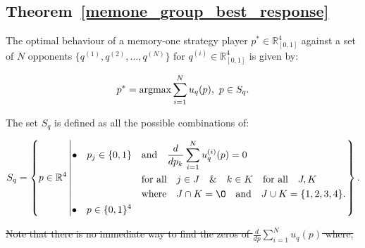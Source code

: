 \documentclass[10pt]{article}
\newcommand{\R}{\mathbb{R}}
\newtheorem{theorem}{Theorem}
\providecommand{\DIFaddtex}[1]{{\protect\color{blue}\uwave{#1}}} %
\providecommand{\DIFdeltex}[1]{{\protect\color{red}\sout{#1}}}                      %
\providecommand{\DIFaddbegin}{} %
\providecommand{\DIFaddend}{} %
\providecommand{\DIFdelbegin}{} %
\providecommand{\DIFdelend}{} %
\providecommand{\DIFadd}[1]{\texorpdfstring{\DIFaddtex{#1}}{#1}} %
\providecommand{\DIFdel}[1]{\texorpdfstring{\DIFdeltex{#1}}{}} %
\newcommand{\DIFscaledelfig}{0.5}
\newlength{\DIFdelgraphicswidth} %
\newlength{\DIFdelgraphicsheight} %
\newcommand{\DIFaddincludegraphics}[2][]{{\color{blue}\fbox{\DIFOincludegraphics[#1]{#2}}}} %
\newcommand{\DIFdelincludegraphics}[2][]{%
\sbox{\DIFdelgraphicsbox}{\DIFOincludegraphics[#1]{#2}}%
\settoboxwidth{\DIFdelgraphicswidth}{\DIFdelgraphicsbox} %
\settoboxtotalheight{\DIFdelgraphicsheight}{\DIFdelgraphicsbox} %
\scalebox{\DIFscaledelfig}{%
\parbox[b]{\DIFdelgraphicswidth}{\usebox{\DIFdelgraphicsbox}\\[-\baselineskip] \rule{\DIFdelgraphicswidth}{0em}}\llap{\resizebox{\DIFdelgraphicswidth}{\DIFdelgraphicsheight}{%
\setlength{\unitlength}{\DIFdelgraphicswidth}%
\begin{picture}(1,1)%
\thicklines\linethickness{2pt} %
{\color[rgb]{1,0,0}\put(0,0){\framebox(1,1){}}}%
{\color[rgb]{1,0,0}\put(0,0){\line( 1,1){1}}}%
{\color[rgb]{1,0,0}\put(0,1){\line(1,-1){1}}}%
\end{picture}%
}\hspace*{3pt}}} %
} %
\DeclareRobustCommand{\DIFaddbegin}{\DIFOaddbegin \let\includegraphics\DIFaddincludegraphics} %
\DeclareRobustCommand{\DIFaddend}{\DIFOaddend \let\includegraphics\DIFOincludegraphics} %
\DeclareRobustCommand{\DIFdelbegin}{\DIFOdelbegin \let\includegraphics\DIFdelincludegraphics} %
\DeclareRobustCommand{\DIFdelend}{\DIFOaddend \let\includegraphics\DIFOincludegraphics} %
\begin{document}
\subsection{Theorem~\ref{memone_group_best_response} \DIFaddbegin \DIFadd{Proof}\DIFaddend }\DIFdelbegin %

\DIFdelend \DIFaddbegin \label{appendix:memone_group_best_response}
\DIFaddend The optimal behaviour of a memory-one strategy player \(p^* \in \R_{[0, 1]} ^
4\) against a set of \(N\) opponents \(\{q^{(1)}, q^{(2)}, \dots, q^{(N)} \}\)
for \(q^{(i)} \in \R_{[0, 1]} ^ 4\) is given by:

\[p^* = \textnormal{argmax}\sum\limits_{i=1} ^ N  u_q(p), \ p \in S_q.\]

The set \(S_q\) is defined as all the possible combinations of:

\DIFdelbegin %
\DIFdelend \begin{equation}\label{eq:s_q_set}
    S_q =
    \left\{p \in \mathbb{R} ^ 4 \left|
        \begin{aligned}
            \bullet\quad p_j \in \{0, 1\} & \quad \text{and} \quad \frac{d}{dp_k}
            \sum\limits_{i=1} ^ N  u_q^{(i)}(p) = 0 \\
            & \quad \text{for all} \quad j \in J \quad \&  \quad k \in K  \quad \text{for all} \quad J, K \\
            & \quad \text{where} \quad J \cap K = \O \quad
            \text{and} \quad J \cup K = \{1, 2, 3, 4\}.\\
            \bullet\quad  p \in \{0, 1\} ^ 4
        \end{aligned}\right.
    \right\}.
\end{equation}
\DIFdelbegin %
\DIFdelend 

\DIFdelbegin \DIFdel{Note that there is no immediate way to find the zeros of
\(\frac{d}{dp} \sum\limits_{i=1} ^ N  u_q(p)\) where,
}%

\end{document}
